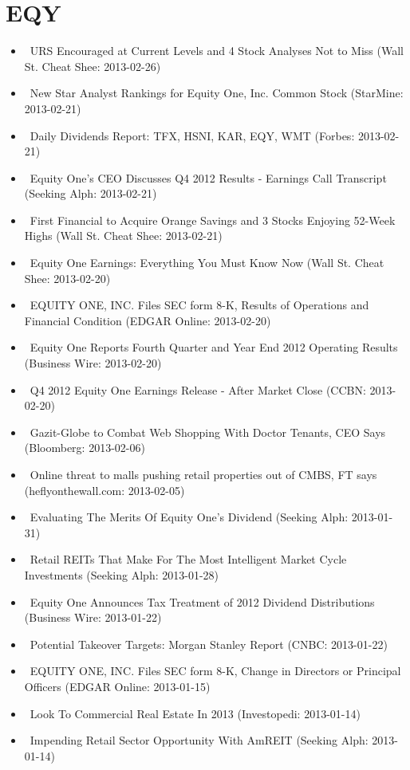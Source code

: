 \documentclass[11pt,asymmetric]{article}
\begin{document}
\section*{EQY}
\begin{itemize}
\item\ URS Encouraged at Current Levels and 4 Stock Analyses Not to Miss (Wall St. Cheat Shee: 2013-02-26)
\item\ New Star Analyst Rankings for Equity One, Inc. Common Stock (StarMine: 2013-02-21)
\item\ Daily Dividends Report: TFX, HSNI, KAR, EQY, WMT (Forbes: 2013-02-21)
\item\ Equity One's CEO Discusses Q4 2012 Results - Earnings Call Transcript (Seeking Alph: 2013-02-21)
\item\ First Financial to Acquire Orange Savings and 3 Stocks Enjoying 52-Week Highs (Wall St. Cheat Shee: 2013-02-21)
\item\ Equity One Earnings: Everything You Must Know Now (Wall St. Cheat Shee: 2013-02-20)
\item\ EQUITY ONE, INC. Files SEC form 8-K, Results of Operations and Financial Condition (EDGAR Online: 2013-02-20)
\item\ Equity One Reports Fourth Quarter and Year End 2012 Operating Results (Business Wire: 2013-02-20)
\item\ Q4 2012 Equity One Earnings Release - After Market Close (CCBN: 2013-02-20)
\item\ Gazit-Globe to Combat Web Shopping With Doctor Tenants, CEO Says (Bloomberg: 2013-02-06)
\item\ Online threat to malls pushing retail properties out of CMBS, FT says (heflyonthewall.com: 2013-02-05)
\item\ Evaluating The Merits Of Equity One's Dividend (Seeking Alph: 2013-01-31)
\item\ Retail REITs That Make For The Most Intelligent Market Cycle Investments (Seeking Alph: 2013-01-28)
\item\ Equity One Announces Tax Treatment of 2012 Dividend Distributions (Business Wire: 2013-01-22)
\item\ Potential Takeover Targets: Morgan Stanley Report (CNBC: 2013-01-22)
\item\ EQUITY ONE, INC. Files SEC form 8-K, Change in Directors or Principal Officers (EDGAR Online: 2013-01-15)
\item\ Look To Commercial Real Estate In 2013 (Investopedi: 2013-01-14)
\item\ Impending Retail Sector Opportunity With AmREIT (Seeking Alph: 2013-01-14)

\end{itemize}
\end{document}
